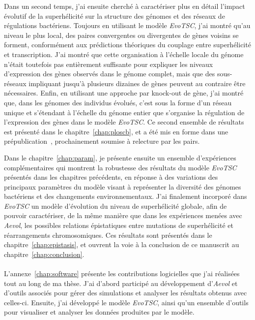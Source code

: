 Dans un second temps, j'ai ensuite cherché à caractériser plus en détail l'impact évolutif de la superhélicité sur la structure des génomes et des réseaux de régulations bactériens.
Toujours en utilisant le modèle \emph{EvoTSC}, j'ai montré qu'au niveau le plus local, des paires convergentes ou divergentes de gènes voisins se forment, conformément aux prédictions théoriques du couplage entre superhélicité et transcription.
J'ai montré que cette organisation à l'échelle locale du génome n'était toutefois pas entièrement suffisante pour expliquer les niveaux d'expression des gènes observés dans le génome complet, mais que des sous-réseaux impliquant jusqu'à plusieurs dizaines de gènes peuvent au contraire être nécessaires.
Enfin, en utilisant une approche par knock-out de gène, j'ai montré que, dans les génomes des individus évolués, c'est sous la forme d'un réseau unique et s'étendant à l'échelle du génome entier que s'organise la régulation de l'expression des gènes dans le modèle \emph{EvoTSC}.
Ce second ensemble de résultats est présenté dans le chapitre~\ref{chap:ploscb}, et a été mis en forme dans une prépublication~\citep{grohens2022b}, prochainement soumise à relecture par les pairs.

Dans le chapitre~\ref{chap:param}, je présente ensuite un ensemble d'expériences complémentaires qui montrent la robustesse des résultats du modèle \emph{EvoTSC} présentés dans les chapitres précédents, en réponse à des variations des principaux paramètres du modèle visant à représenter la diversité des génomes bactériens et des changements environnementaux.
J'ai finalement incorporé dans \emph{EvoTSC} un modèle d'évolution du niveau de superhélicité globale, afin de pouvoir caractériser, de la même manière que dans les expériences menées avec \emph{Aevol}, les possibles relations épistatiques entre mutations de superhélicité et réarrangements chromosomiques.
Ces résultats sont présentés dans le chapitre~\ref{chap:epistasis}, et ouvrent la voie à la conclusion de ce manuscrit au chapitre~\ref{chap:conclusion}.

\paragraph{}
L'annexe~\ref{chap:software} présente les contributions logicielles que j'ai réalisées tout au long de ma thèse.
J'ai d'abord participé au développement d'\emph{Aevol} et d'outils associés pour gérer des simulations et analyser les résultats obtenus avec celles-ci.
Ensuite, j'ai développé le modèle \emph{EvoTSC}, ainsi qu'un ensemble d'outils pour visualiser et analyser les données produites par le modèle.


